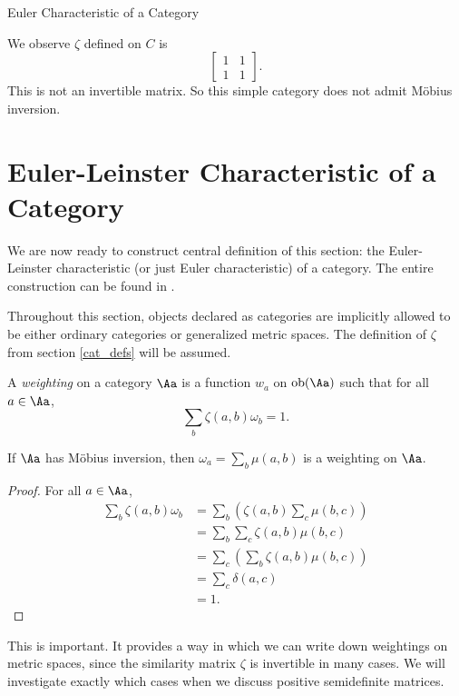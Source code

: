 \documentclass[12pt]{pom_thesis}
\DeclareMathOperator{\obj}{ob}
\begin{document}
\begin{chapter}{Euler Characteristic of a Category}
\begin{examp}
We observe $\zeta$ defined on $C$ is
\[\begin{bmatrix}1 & 1 \\ 1 & 1 \end{bmatrix}.\]
This is not an invertible matrix. So this simple category does not admit M\"obius inversion.
\end{examp} 

\section{Euler-Leinster Characteristic of a Category}
We are now ready to construct central definition of this section: the Euler-Leinster characteristic (or just Euler characteristic) of a category. The entire construction can be found in \cite{Lein1, Lein2, Lein4}. 

Throughout this section, objects declared as categories are implicitly allowed to be either ordinary categories or generalized metric spaces. The definition of $\zeta$ from section \ref{cat_defs} will be assumed.

\begin{defn}
A \emph{weighting} on a category $\Aa$ is a function $w_a$ on $\obj(\Aa)$ such that for all $a \in \Aa$,
\[
\sum_b \zeta(a,b)\omega_b = 1.
\]
\end{defn}

\begin{lemma}
\label{mobius_is_weighting}
If $\Aa$ has M\"obius inversion, then $\omega_a = \sum_b \mu(a,b)$ is a weighting on $\Aa$.
\end{lemma}
\begin{proof} For all $a \in \Aa$,
\begin{align*}
\sum_b \zeta(a,b)\omega_b &= \sum_b\left( \zeta(a,b)\sum_c \mu(b,c)\right)\\
&=\sum_b\sum_c\zeta(a,b)\mu(b,c)\\
&=\sum_c\left(\sum_b\zeta(a,b)\mu(b,c)\right)\\
&=\sum_c \delta(a,c)\\
&=1.
\end{align*}
\end{proof}

This is important. It provides a way in which we can write down weightings on metric spaces, since the similarity matrix $\zeta$ is invertible in many cases. We will investigate exactly which cases when we discuss positive semidefinite matrices.


\end{chapter}
\end{document}
